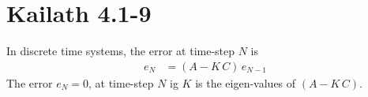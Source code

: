 \section{Kailath 4.1-9}
In discrete time systems, the error at time-step $N$ is 
\begin{align*}
    e_{N} &= \left(A - K\,C\right)\,e_{N-1}
\end{align*}
The error $e_N = 0$, at time-step $N$ ig $K$ is the eigen-values of $\left(A - K\,C\right)$.
